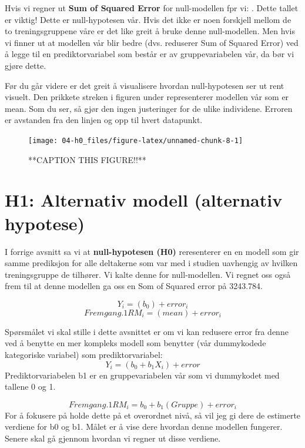 \documentclass[
]{book}
\begin{document}
Hvis vi regner ut \textbf{Sum of Squared Error} for null-modellen fpr vi: . Dette tallet er viktig! Dette er null-hypotesen vår. Hvis det ikke er noen forskjell mellom de to treningsgruppene våre er det like greit å bruke denne null-modellen. Men hvis vi finner ut at modellen vår blir bedre (dvs. reduserer Sum of Squared Error) ved å legge til en prediktorvariabel som består er av gruppevariabelen vår, da bør vi gjøre dette.

Før du går videre er det greit å visualisere hvordan null-hypotesen ser ut rent visuelt. Den prikkete streken i figuren under representerer modellen vår som er mean. Som du ser, så gjør den ingen justeringer for de ulike individene. Erroren er avstanden fra den linjen og opp til hvert datapunkt.

\begin{figure}

{\centering \texttt{[image: 04-h0\_files/figure-latex/unnamed-chunk-8-1]} 

}

\caption{**CAPTION THIS FIGURE!!**}\label{fig:unnamed-chunk-8}
\end{figure}

\hypertarget{h1-alternativ-modell-alternativ-hypotese}{%
\section{H1: Alternativ modell (alternativ hypotese)}\label{h1-alternativ-modell-alternativ-hypotese}}

I forrige avsnitt sa vi at \textbf{null-hypotesen (H0)} reresenterer en en modell som gir samme prediksjon for alle deltakerne som var med i studien uavhengig av hvilken treningsgruppe de tilhører. Vi kalte denne for null-modellen. Vi regnet oss også frem til at denne modellen ga oss en Som of Squared error på 3243.784.

\[
Y_i = (b_0) + error_i
\]
\[
Fremgang.1RM_i = (mean) + error_i
\]

Spørsmålet vi skal stille i dette avsnittet er om vi kan redusere error fra denne ved å benytte en mer kompleks modell som benytter (vår dummykodede kategoriske variabel) som prediktorvariabel:
\[
Y_i = (b_0 + b_1X_i) + error
\]
Prediktorvariabelen b1 er en gruppevariabelen vår som vi dummykodet med tallene 0 og 1.

\[
Fremgang.1RM_i = b_0 + b_1(Gruppe) + error_i
\]
For å fokusere på holde dette på et overordnet nivå, så vil jeg gi dere de estimerte verdiene for b0 og b1. Målet er å vise dere hvordan denne modellen fungerer. Senere skal gå gjennom hvordan vi regner ut disse verdiene.
\end{document}
